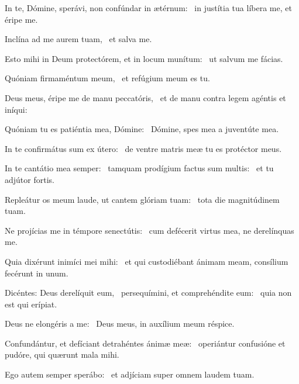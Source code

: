 \item In te, Dómine, sperávi, non confúndar in ætérnum:~\psstar{} in justítia tua líbera me, et éripe me.

\item Inclína ad me aurem tuam,~\psstar{} et salva me.

\item Esto mihi in Deum protectórem, et in locum munítum:~\psstar{} ut salvum me fácias.

\item Quóniam firmaméntum meum,~\psstar{} et refúgium meum es tu.

\item Deus meus, éripe me de manu peccatóris,~\psstar{} et de manu contra legem agéntis et iníqui:

\item Quóniam tu es patiéntia mea, Dómine:~\psstar{} Dómine, spes mea a juventúte mea.

\item In te confirmátus sum ex útero:~\psstar{} de ventre matris meæ tu es protéctor meus.

\item In te cantátio mea semper:~\pscross{} tamquam prodígium factus sum multis:~\psstar{} et tu adjútor fortis.

\item Repleátur os meum laude, ut cantem glóriam tuam:~\psstar{} tota die magnitúdinem tuam.

\item Ne projícias me in témpore senectútis:~\psstar{} cum defécerit virtus mea, ne derelínquas me.

\item Quia dixérunt inimíci mei mihi:~\psstar{} et qui custodiébant ánimam meam, consílium fecérunt in unum.

\item Dicéntes: Deus derelíquit eum,~\pscross{} persequímini, et comprehéndite eum:~\psstar{} quia non est qui erípiat.

\item Deus ne elongéris a me:~\psstar{} Deus meus, in auxílium meum réspice.

\item Confundántur, et defíciant detrahéntes ánimæ meæ:~\psstar{} operiántur confusióne et pudóre, qui quærunt mala mihi.

\item Ego autem semper sperábo:~\psstar{} et adjíciam super omnem laudem tuam.

